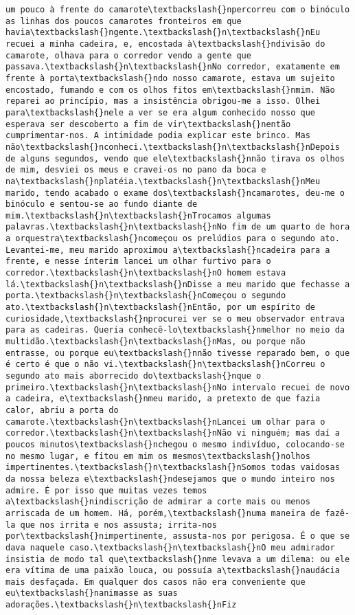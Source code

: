 \begin{Verbatim}[commandchars=\\\{\}]
um pouco à frente do camarote\textbackslash{}npercorreu com o binóculo as linhas dos poucos camarotes fronteiros em que havia\textbackslash{}ngente.\textbackslash{}n\textbackslash{}nEu recuei a minha cadeira, e, encostada à\textbackslash{}ndivisão do camarote, olhava para o corredor vendo a gente que passava.\textbackslash{}n\textbackslash{}nNo corredor, exatamente em frente à porta\textbackslash{}ndo nosso camarote, estava um sujeito encostado, fumando e com os olhos fitos em\textbackslash{}nmim. Não reparei ao princípio, mas a insistência obrigou-me a isso. Olhei para\textbackslash{}nele a ver se era algum conhecido nosso que esperava ser descoberto a fim de vir\textbackslash{}nentão cumprimentar-nos. A intimidade podia explicar este brinco. Mas não\textbackslash{}nconheci.\textbackslash{}n\textbackslash{}nDepois de alguns segundos, vendo que ele\textbackslash{}nnão tirava os olhos de mim, desviei os meus e cravei-os no pano da boca e na\textbackslash{}nplatéia.\textbackslash{}n\textbackslash{}nMeu marido, tendo acabado o exame dos\textbackslash{}ncamarotes, deu-me o binóculo e sentou-se ao fundo diante de mim.\textbackslash{}n\textbackslash{}nTrocamos algumas palavras.\textbackslash{}n\textbackslash{}nNo fim de um quarto de hora a orquestra\textbackslash{}ncomeçou os prelúdios para o segundo ato. Levantei-me, meu marido aproximou a\textbackslash{}ncadeira para a frente, e nesse ínterim lancei um olhar furtivo para o corredor.\textbackslash{}n\textbackslash{}nO homem estava lá.\textbackslash{}n\textbackslash{}nDisse a meu marido que fechasse a porta.\textbackslash{}n\textbackslash{}nComeçou o segundo ato.\textbackslash{}n\textbackslash{}nEntão, por um espírito de curiosidade,\textbackslash{}nprocurei ver se o meu observador entrava para as cadeiras. Queria conhecê-lo\textbackslash{}nmelhor no meio da multidão.\textbackslash{}n\textbackslash{}nMas, ou porque não entrasse, ou porque eu\textbackslash{}nnão tivesse reparado bem, o que é certo é que o não vi.\textbackslash{}n\textbackslash{}nCorreu o segundo ato mais aborrecido do\textbackslash{}nque o primeiro.\textbackslash{}n\textbackslash{}nNo intervalo recuei de novo a cadeira, e\textbackslash{}nmeu marido, a pretexto de que fazia calor, abriu a porta do camarote.\textbackslash{}n\textbackslash{}nLancei um olhar para o corredor.\textbackslash{}n\textbackslash{}nNão vi ninguém; mas daí a poucos minutos\textbackslash{}nchegou o mesmo indivíduo, colocando-se no mesmo lugar, e fitou em mim os mesmos\textbackslash{}nolhos impertinentes.\textbackslash{}n\textbackslash{}nSomos todas vaidosas da nossa beleza e\textbackslash{}ndesejamos que o mundo inteiro nos admire. É por isso que muitas vezes temos a\textbackslash{}nindiscrição de admirar a corte mais ou menos arriscada de um homem. Há, porém,\textbackslash{}numa maneira de fazê-la que nos irrita e nos assusta; irrita-nos por\textbackslash{}nimpertinente, assusta-nos por perigosa. É o que se dava naquele caso.\textbackslash{}n\textbackslash{}nO meu admirador insistia de modo tal que\textbackslash{}nme levava a um dilema: ou ele era vítima de uma paixão louca, ou possuía a\textbackslash{}naudácia mais desfaçada. Em qualquer dos casos não era conveniente que eu\textbackslash{}nanimasse as suas adorações.\textbackslash{}n\textbackslash{}nFiz 
\end{Verbatim}
